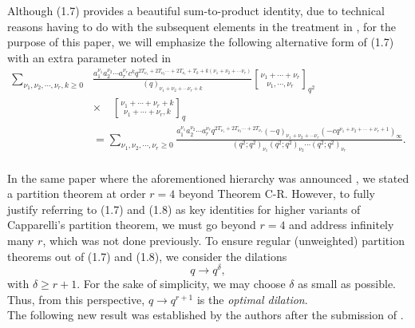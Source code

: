 \documentclass[12pt,a4paper]{amsart}
\theoremstyle{definition}
\theoremstyle{notation}
\theoremstyle{corollary}
\begin{document}
Although (1.7) provides a beautiful sum-to-product identity, due to technical reasons having to do with the subsequent elements in the treatment in \cite{KAGEABG95}, for the purpose of this paper, we will emphasize the following alternative form of (1.7) with an extra parameter noted in \cite{YAKA25}
\begin{align*}
\sum_{\nu_1, \nu_2, \cdots, \nu_r, k\ge 0}&\frac{a^{\nu_1}_1a^{\nu_2}_2\cdots a^{\nu_r}_rc^kq^{2T_{\nu_1}+2T_{\nu_2}\cdots +2T_{\nu_r}+T_k+k(\nu_1+\nu_2+\cdots \nu_r)}}{(q)_{\nu_1+\nu_2+\cdots\nu_r+k}}{{\nu_1+\cdots+\nu_r}\brack {\nu_1, \cdots, \nu_r}}_{q^2}\\
&\times \quad {{\nu_1+\cdots+\nu_r+k}\brack {\nu_1+\cdots+\nu_r,k}}_{q}\\
&=\sum_{\nu_1, \nu_2, \cdots, \nu_r\ge 0}\frac{a^{\nu_1}_1a^{\nu_2}_2\cdots a^{\nu_r}_rq^{2T_{\nu_1}+2T_{\nu_2}\cdots +2T_{\nu_r}}(-q)_{\nu_1+\nu_2+\cdots\nu_r}(-cq^{\nu_1+\nu_2+\cdots +\nu_r+1})_{\infty}}{(q^2;q^2)_{\nu_1}(q^2;q^2)_{\nu_2}\cdots (q^2;q^2)_{\nu_r}}. \tag{1.8}\\
\end{align*}

In the same paper where the aforementioned hierarchy was announced \cite{YAKA25}, we stated a partition theorem at order $r=4$ beyond Theorem C-R. However, to fully justify referring to (1.7) and (1.8) as key identities for higher variants of Capparelli's partition theorem, we must go beyond $r=4$ and address infinitely many $r$, which was not done previously. To ensure regular (unweighted) partition theorems out of (1.7) and (1.8), we consider the dilations
\[q\to q^\delta,\]
with $\delta\geq r+1$. For the sake of simplicity, we may choose $\delta$ as small as possible. Thus, from this perspective,  $q \to q^{r+1}$ is the \textit{optimal dilation}.\\

The following new result was established by the authors after the submission of \cite{YAKA25}.
\end{document}
